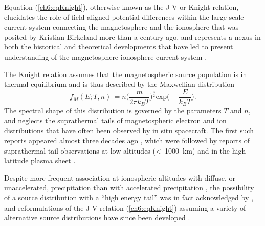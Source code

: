   Equation (\ref{ch6:eqKnight}), otherwise known as the J-V or Knight
  relation, elucidates the role of field-aligned potential differences
  within the large-scale current system connecting the magnetosphere
  and the ionosphere that was posited by Kristian Birkeland more than
  a century ago, and represents a nexus in both the historical and
  theoretical developments that have led to present understanding of
  the magnetosphere-ionosphere current system
  \citep[e.g.,][]{Temerin1997,Hultqvist1999,Cowley2000,Bostrom2003a,Paschmann2003,Pierrard2007a,Karlsson2012}.

  The Knight relation assumes that the magnetospheric source
  population is in thermal equilibrium and is thus described by the
  Maxwellian distribution
  \begin{equation} \label{ch6:eqMax1D} f_{M}( E ; T, n) \, = n \Big (
    \dfrac{m}{2 \pi k_{B} T} \Big )^{\frac{3}{2}} \textrm{exp} \Big (
    - \dfrac{E}{ k_B T } \Big ).
  \end{equation}
  The spectral shape of this distribution is governed by the
  parameters $T$ and $n$, and neglects the suprathermal tails of
  magnetospheric electron and ion distributions that have often been
  observed by in situ spacecraft. The first such reports appeared
  almost three decades ago \citep{Christon1989,Christon1991}, which
  were followed by reports of suprathermal tail observations at low
  altitudes (<~1000~km) and in the high-latitude plasma sheet
  \citep{Wing1998,Kletzing2003}.

  Despite more frequent association at ionospheric altitudes with
  diffuse, or unaccelerated, precipitation than with accelerated
  precipitation \citep[see, e.g., ][]{Newell2009,McIntosh2014}, the
  possibility of a source distribution with a ``high energy tail'' was
  in fact acknowledged by \citet{Knight1973}, and reformulations of
  the J-V relation (\ref{ch6:eqKnight}) assuming a variety of
  alternative source distributions have since been developed
  \citep{Pierrard1996,Janhunen1998,Dors1999,Bostrom2003a,Bostrom2004}.

